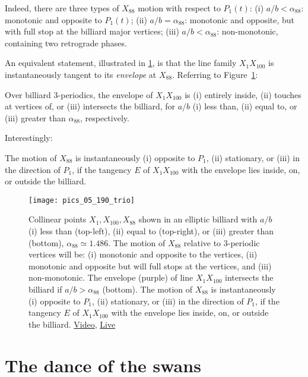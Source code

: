 Indeed, there are three types of $X_{88}$ motion with respect to $P_1(t)$: (i) $a/b<\alpha_{88}$: monotonic and opposite to $P_1(t)$; (ii) $a/b=\alpha_{88}$: monotonic and opposite, but with full stop at the billiard major vertices; (iii) $a/b<\alpha_{88}$: non-monotonic, containing two retrograde phases.

An equivalent statement, illustrated in \cref{fig:05-x88-envelope}, is that the line family $X_1 X_{100}$ is instantaneously tangent to its {\em envelope} at $X_{88}$. Referring to Figure~\ref{fig:05-x88-envelope}:

\begin{proposition}
Over billiard 3-periodics, the envelope of $X_1 X_{100}$ is (i) entirely inside, (ii) touches at vertices of, or (iii) intersects the billiard, for $a/b$ (i) less than, (ii) equal to, or (iii) greater than $\alpha_{88}$, respectively. 
\label{prop:05-x88-env}
\end{proposition}

Interestingly:

\begin{proposition}
The motion of $X_{88}$ is instantaneously (i) opposite to $P_1$, (ii) stationary, or (iii) in the direction of $P_1$, if the tangency $E$ of $X_1 X_{100}$ with the envelope lies inside, on, or outside the billiard.
\label{prop:05-x88-envelope}
\end{proposition}

\begin{figure}
    \centering
    \texttt{[image: pics\_05\_190\_trio]}
     \caption{Collinear points $X_1,X_{100},X_{88}$ shown in an elliptic billiard with $a/b$ (i) less than (top-left), (ii) equal to (top-right), or (iii) greater than (bottom), $\alpha_{88}{\simeq}1.486$. The motion of $X_{88}$ relative to 3-periodic vertices will be: (i) monotonic and opposite to the vertices, (ii) monotonic and opposite but will full stops at the vertices, and (iii) non-monotonic. The envelope (purple) of line  $X_1 X_{100}$ intersects the billiard if $a/b>\alpha_{88}$ (bottom). The motion of $X_{88}$ is instantaneously (i) opposite to $P_1$, (ii) stationary, or (iii) in the direction of $P_1$, if the tangency $E$ of $X_1 X_{100}$ with the envelope lies inside, on, or outside the billiard. \href{https://youtu.be/nJLp--JjDZU}{Video}, \href{https://bit.ly/3hKicgM}{Live}}
    \label{fig:05-x88-envelope}
\end{figure}

\section{The dance of the swans}
\label{sec:05-swans}

